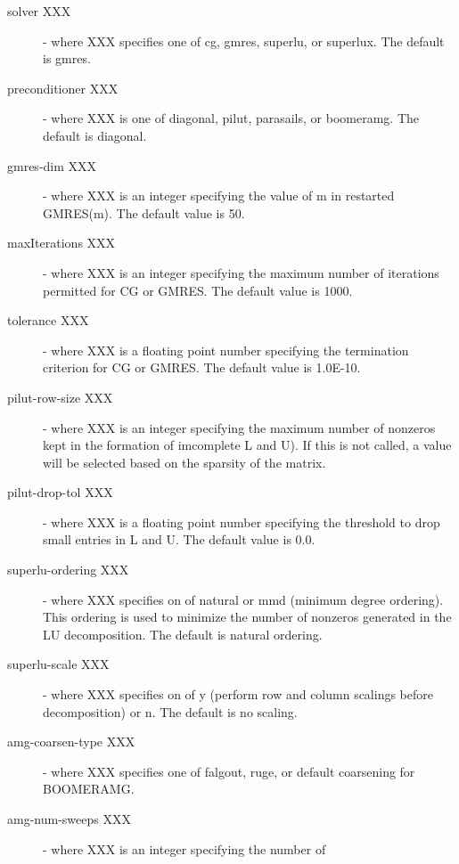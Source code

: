 \begin{description}
\item[solver XXX] - where XXX specifies one of {\sf cg}, {\sf gmres},
                    {\sf superlu}, or {\sf superlux}.  The default is {\sf gmres}.
\item[preconditioner XXX] - where XXX is one of {\sf diagonal}, {\sf pilut},
                    {\sf parasails}, or {\sf boomeramg}. The default 
                    is {\sf diagonal}.
\item[gmres-dim XXX] - where XXX is an integer specifying the value of m in
                       restarted GMRES(m).  The default value is 50.
\item[maxIterations XXX] - where XXX is an integer specifying the maximum number
                           of iterations permitted for CG or GMRES.
                           The default value is 1000.
\item[tolerance XXX] - where XXX is a floating point number specifying the 
                       termination criterion for CG or GMRES.  The default value is
                       1.0E-10.
\item[pilut-row-size XXX] - where XXX is an integer specifying the maximum
                       number of nonzeros kept in the formation of imcomplete L
                       and U).  If this is not called, a value will be selected
                       based on the sparsity of the matrix.
\item[pilut-drop-tol XXX] - where XXX is a floating point number specifying the 
                       threshold to drop small entries in L and U.  The default
                       value is 0.0.
\item[superlu-ordering XXX] - where XXX specifies on of {\sf natural} or
                       {\sf mmd} (minimum degree ordering).  This ordering
                       is used to minimize the number of nonzeros generated
                       in the LU decomposition.  The default is natural ordering.
\item[superlu-scale XXX] - where XXX specifies on of {\sf y} (perform row
                       and column scalings before decomposition) or {\sf n}.
                       The default is no scaling.
\item[amg-coarsen-type XXX] - where XXX specifies one of {\sf falgout},
                       {\sf ruge}, or {\sf default} coarsening for BOOMERAMG.
\item[amg-num-sweeps XXX] - where XXX is an integer specifying the number of

\end{description}
